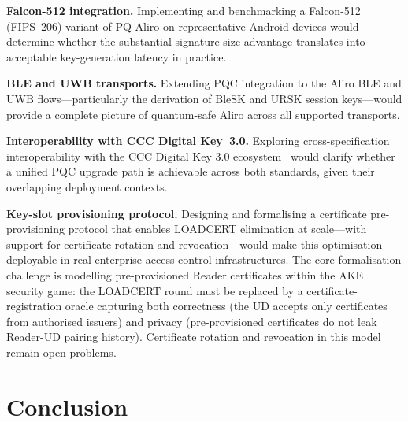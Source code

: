 \documentclass[runningheads]{llncs}
\begin{document}
\textbf{Falcon-512 integration.}
Implementing and benchmarking a Falcon-512 (FIPS~206) variant of PQ-Aliro on representative Android devices would determine whether the substantial signature-size advantage translates into acceptable key-generation latency in practice.

\textbf{BLE and UWB transports.}
Extending PQC integration to the Aliro BLE and UWB flows---particularly the derivation of BleSK and URSK session keys---would provide a complete picture of quantum-safe Aliro across all supported transports.

\textbf{Interoperability with CCC Digital Key~3.0.}
Exploring cross-specification interoperability with the CCC Digital Key 3.0 ecosystem~\cite{CCC:DigKey3} would clarify whether a unified PQC upgrade path is achievable across both standards, given their overlapping deployment contexts.

\textbf{Key-slot provisioning protocol.}
Designing and formalising a certificate pre-provisioning protocol that enables LOADCERT elimination at scale---with support for certificate rotation and revocation---would make this optimisation deployable in real enterprise access-control infrastructures. The core formalisation challenge is modelling pre-provisioned Reader certificates within the AKE security game: the LOADCERT round must be replaced by a certificate-registration oracle capturing both correctness (the UD accepts only certificates from authorised issuers) and privacy (pre-provisioned certificates do not leak Reader-UD pairing history). Certificate rotation and revocation in this model remain open problems.


\section{Conclusion}
\end{document}
